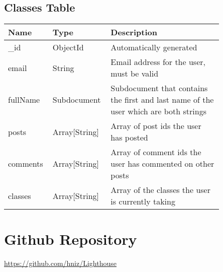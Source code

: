 \documentclass[preprint,11pt,3p]{article}
\begin{document}
\subsection{Classes Table}
\begingroup
\setlength{\tabcolsep}{15pt} %
\renewcommand{\arraystretch}{1.5} %
\begin{tabular}{| p{0.15\linewidth} | p{0.20\linewidth} | p{0.5\linewidth} |}
	\hline
	\textbf{Name} & \textbf{Type} & \textbf{Description} \\
	\hline
	_id & ObjectId & Automatically generated\\
	\hline
	email & String & Email address for the user, must be valid\\
	\hline
	fullName & Subdocument & Subdocument that contains the first and last name of the user which are both strings\\
	\hline
	posts & Array[String] & Array of post ids the user has posted\\
	\hline
	comments & Array[String] & Array of comment ids the user has commented on other posts\\
	\hline
	classes & Array[String] & Array of the classes the user is currently taking\\
	\hline
\end{tabular}
\endgroup

\newpage

\section{Github Repository}
\href{https://github.com/hniz/Lighthouse}{https://github.com/hniz/Lighthouse}
\end{document}
